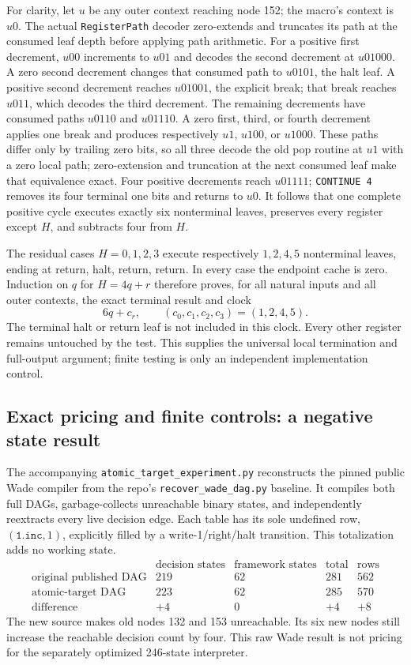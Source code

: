For clarity, let $u$ be any outer context reaching node 152; the macro's
context is $u0$.  The actual \texttt{RegisterPath} decoder zero-extends and
truncates its path at the consumed leaf depth before applying path arithmetic.
For a positive first decrement, $u00$ increments to $u01$ and decodes the
second decrement at $u01000$.  A zero second decrement changes that consumed
path to $u0101$, the halt leaf.  A positive second decrement reaches
$u01001$, the explicit break; that break reaches $u011$, which decodes the
third decrement.  The remaining decrements have consumed paths $u0110$ and
$u01110$.  A zero first, third, or fourth decrement applies one break and
produces respectively $u1$, $u100$, or $u1000$.  These paths differ only by
trailing zero bits, so all three decode the old pop routine at $u1$ with a
zero local path; zero-extension and truncation at the next consumed leaf make
that equivalence exact.  Four positive decrements reach $u01111$;
\texttt{CONTINUE 4} removes its four terminal one bits and returns to $u0$.
It follows that one complete positive cycle executes exactly six nonterminal
leaves, preserves every register except $H$, and subtracts four from $H$.

The residual cases $H=0,1,2,3$ execute respectively $1,2,4,5$ nonterminal
leaves, ending at return, halt, return, return.  In every case the endpoint
cache is zero.  Induction on $q$ for $H=4q+r$ therefore proves, for all natural
inputs and all outer contexts, the exact terminal result and clock
\[
  6q+c_r,\qquad (c_0,c_1,c_2,c_3)=(1,2,4,5).
\]
The terminal halt or return leaf is not included in this clock.  Every other
register remains untouched by the test.  This supplies the universal local
termination and full-output argument; finite testing is only an independent
implementation control.

\subsection{Exact pricing and finite controls: a negative state result}

The accompanying \texttt{atomic\_target\_experiment.py} reconstructs the pinned
public Wade compiler from the repo's \texttt{recover\_wade\_dag.py} baseline.
It compiles both full DAGs, garbage-collects unreachable binary states, and
independently reextracts every live decision edge.  Each table has its sole
undefined row, $(\texttt{1.inc},1)$, explicitly filled by a write-1/right/halt
transition.  This totalization adds no working state.
\[
\begin{array}{l|rrrr}
 &\text{decision states}&\text{framework states}&\text{total}&\text{rows}\\ \hline
 \text{original published DAG}&219&62&281&562\\
 \text{atomic-target DAG}&223&62&285&570\\
 \text{difference}&+4&0&+4&+8
\end{array}
\]
The new source makes old nodes 132 and 153 unreachable.  Its six new nodes
still increase the reachable decision count by four.  This raw Wade result is
not pricing for the separately optimized 246-state interpreter.

